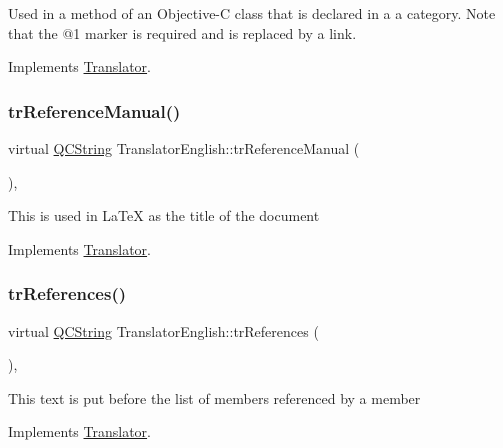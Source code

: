 Used in a method of an Objective-\/C class that is declared in a a category. Note that the @1 marker is required and is replaced by a link. 

Implements \mbox{\hyperlink{class_translator}{Translator}}.

\mbox{\label{class_translator_english_a81a5060373c6c8eb4866cbfbdb25845d}} 
\subsubsection{\texorpdfstring{trReferenceManual()}{trReferenceManual()}}
{\footnotesize\ttfamily virtual \mbox{\hyperlink{class_q_c_string}{Q\+C\+String}} Translator\+English\+::tr\+Reference\+Manual (\begin{DoxyParamCaption}{ }\end{DoxyParamCaption})\hspace{0.3cm}{\ttfamily [inline]}, {\ttfamily [virtual]}}

This is used in La\+TeX as the title of the document 

Implements \mbox{\hyperlink{class_translator}{Translator}}.

\mbox{\label{class_translator_english_a3c9f98191bcc362b159ef0d3c2e4b18f}} 
\subsubsection{\texorpdfstring{trReferences()}{trReferences()}}
{\footnotesize\ttfamily virtual \mbox{\hyperlink{class_q_c_string}{Q\+C\+String}} Translator\+English\+::tr\+References (\begin{DoxyParamCaption}{ }\end{DoxyParamCaption})\hspace{0.3cm}{\ttfamily [inline]}, {\ttfamily [virtual]}}

This text is put before the list of members referenced by a member 

Implements \mbox{\hyperlink{class_translator}{Translator}}.

\mbox{\label{class_translator_english_a8b5ca946c8ca307d697f992ce1ade04e}} 
